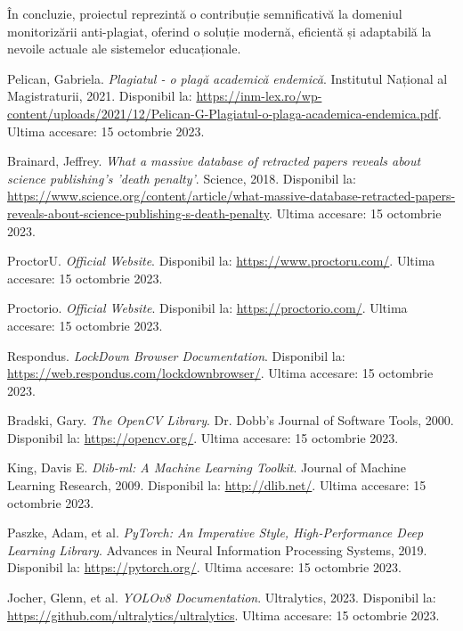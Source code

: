 \documentclass[12pt,a4paper]{article}
\begin{document}
În concluzie, proiectul reprezintă o contribuție semnificativă la domeniul monitorizării anti-plagiat, oferind o soluție modernă, eficientă și adaptabilă la nevoile actuale ale sistemelor educaționale.

\begin{thebibliography}{9}

Pelican, Gabriela. 
\textit{Plagiatul - o plagă academică endemică}. 
Institutul Național al Magistraturii, 2021. 
Disponibil la: \url{https://inm-lex.ro/wp-content/uploads/2021/12/Pelican-G-Plagiatul-o-plaga-academica-endemica.pdf}. 
Ultima accesare: 15 octombrie 2023.

Brainard, Jeffrey. 
\textit{What a massive database of retracted papers reveals about science publishing's 'death penalty'}. 
Science, 2018. 
Disponibil la: \url{https://www.science.org/content/article/what-massive-database-retracted-papers-reveals-about-science-publishing-s-death-penalty}. 
Ultima accesare: 15 octombrie 2023.

ProctorU. 
\textit{Official Website}. 
Disponibil la: \url{https://www.proctoru.com/}. 
Ultima accesare: 15 octombrie 2023.

Proctorio. 
\textit{Official Website}. 
Disponibil la: \url{https://proctorio.com/}. 
Ultima accesare: 15 octombrie 2023.

Respondus. 
\textit{LockDown Browser Documentation}. 
Disponibil la: \url{https://web.respondus.com/lockdownbrowser/}. 
Ultima accesare: 15 octombrie 2023.

Bradski, Gary. 
\textit{The OpenCV Library}. 
Dr. Dobb's Journal of Software Tools, 2000. 
Disponibil la: \url{https://opencv.org/}. 
Ultima accesare: 15 octombrie 2023.

King, Davis E. 
\textit{Dlib-ml: A Machine Learning Toolkit}. 
Journal of Machine Learning Research, 2009. 
Disponibil la: \url{http://dlib.net/}. 
Ultima accesare: 15 octombrie 2023.

Paszke, Adam, et al. 
\textit{PyTorch: An Imperative Style, High-Performance Deep Learning Library}. 
Advances in Neural Information Processing Systems, 2019. 
Disponibil la: \url{https://pytorch.org/}. 
Ultima accesare: 15 octombrie 2023.

Jocher, Glenn, et al. 
\textit{YOLOv8 Documentation}. 
Ultralytics, 2023. 
Disponibil la: \url{https://github.com/ultralytics/ultralytics}. 
Ultima accesare: 15 octombrie 2023.


\end{thebibliography}
\end{document}
